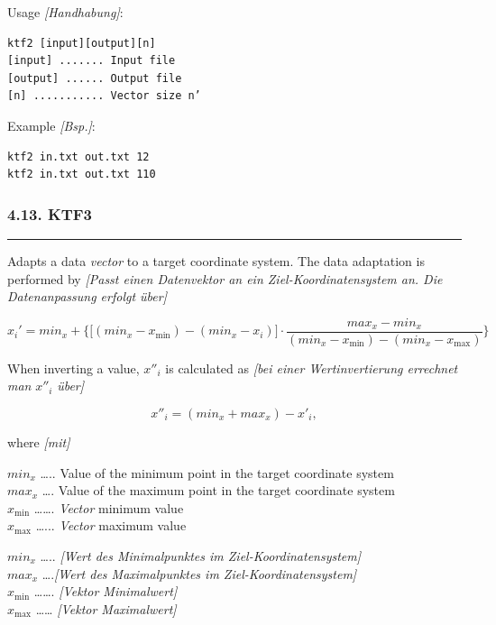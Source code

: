 \documentclass[
]{article}
\begin{document}
Usage \emph{{[}Handhabung{]}}:

\begin{verbatim}
ktf2 [input][output][n] 
[input] ....... Input file 
[output] ...... Output file 
[n] ........... Vector size n’
\end{verbatim}

Example \emph{{[}Bsp.{]}}:

\begin{verbatim}
ktf2 in.txt out.txt 12
ktf2 in.txt out.txt 110
\end{verbatim}

\hypertarget{ktf3}{%
\subsubsection{4.13. KTF3}\label{ktf3}}

\begin{center}\rule{0.5\linewidth}{0.5pt}\end{center}

Adapts a data \emph{vector} to a target coordinate system. The data
adaptation is performed by \emph{{[}Passt einen Datenvektor an ein
Ziel-Koordinatensystem an. Die Datenanpassung erfolgt über{]}}

\[x_{i}' = min_{x} + \{\lbrack\left( min_{x} - x_{\min} \right) - \left( min_{x} - x_{i} \right)\rbrack \cdot \frac{max_{x} - min_{x}}{\left( min_{x} - x_{\min} \right) - \left( min_{x} - x_{\max} \right)}\}\]

When inverting a value, \(x''_i\) is calculated as \emph{{[}bei einer
Wertinvertierung errechnet man} \(x''_i\) \emph{über{]}}

\[x''_{i} = \left( min_{x} + max_{x} \right) - x'_{i},\]

where \emph{{[}mit{]}}

\(min_{x}\) \ldots.. Value of the minimum point in the target coordinate
system\\
\(max_{x}\) \ldots. Value of the maximum point in the target coordinate
system\\
\(x_{\min}\) \ldots\ldots. \emph{Vector} minimum value\\
\(x_{\max}\) \ldots... \emph{Vector} maximum value

\(min_{x}\) \ldots.. \emph{{[}Wert des Minimalpunktes im
Ziel-Koordinatensystem{]}}\\
\(max_{x}\) \ldots.\emph{{[}Wert des Maximalpunktes im
Ziel-Koordinatensystem{]}}\\
\(x_{\min}\) \ldots\ldots. \emph{{[}Vektor Minimalwert{]}}\\
\(x_{\max}\) \ldots\ldots{} \emph{{[}Vektor Maximalwert{]}}
\end{document}
